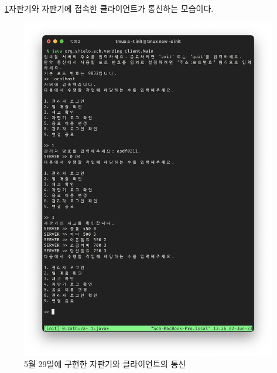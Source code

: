 \documentclass{oblivoir}
\newcommand{\figref}[1]{\figurename~\ref{#1}}
\begin{document}
    \figref{fig:0529-client}\는 자판기와 자판기에 접속한 클라이언트가 통신하는 모습이다.
    \begin{figure}[h]
        \centering
        \includegraphics[width=\textwidth]{0529-client.png}
        \caption{5월 29일에 구현한 자판기와 클라이언트의 통신}
        \label{fig:0529-client}
    \end{figure}
\end{document}
